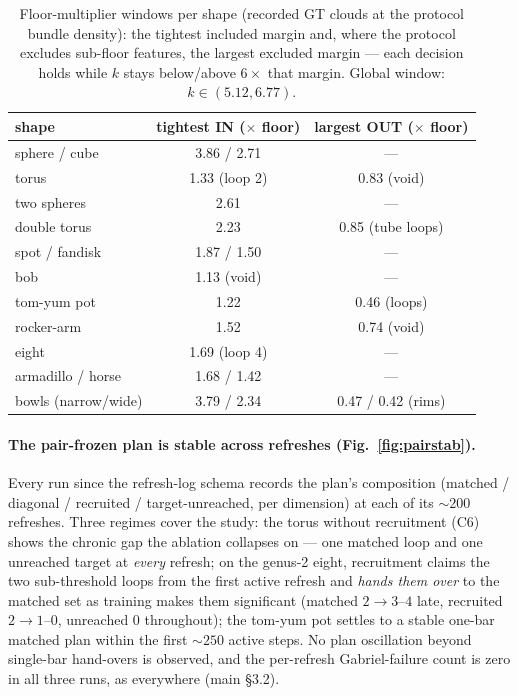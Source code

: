 \begin{table}[t]
\centering
\caption{Floor-multiplier windows per shape (recorded GT clouds at the
protocol bundle density): the tightest included margin and, where the
protocol excludes sub-floor features, the largest excluded margin ---
each decision holds while $k$ stays below/above $6\times$ that margin.
Global window: $k \in (5.12, 6.77)$.}
\label{tab:floorwin}
\scriptsize
\setlength{\tabcolsep}{3.5pt}
\begin{tabular}{lcc}
\toprule
shape & tightest IN ($\times$ floor) & largest OUT ($\times$ floor) \\
\midrule
sphere / cube    & 3.86 / 2.71 & --- \\
torus            & 1.33 (loop 2) & 0.83 (void) \\
two spheres      & 2.61 & --- \\
double torus     & 2.23 & 0.85 (tube loops) \\
spot / fandisk   & 1.87 / 1.50 & --- \\
bob              & 1.13 (void) & --- \\
tom-yum pot      & 1.22 & 0.46 (loops) \\
rocker-arm       & 1.52 & 0.74 (void) \\
eight            & 1.69 (loop 4) & --- \\
armadillo / horse & 1.68 / 1.42 & --- \\
bowls (narrow/wide) & 3.79 / 2.34 & 0.47 / 0.42 (rims) \\
\bottomrule
\end{tabular}
\end{table}

\paragraph{The pair-frozen plan is stable across refreshes
(Fig.~\ref{fig:pairstab}).}
Every run since the refresh-log schema records the plan's composition
(matched / diagonal / recruited / target-unreached, per dimension) at
each of its ${\sim}200$ refreshes. Three regimes cover the study:
the torus without recruitment (C6) shows the chronic gap the ablation
collapses on --- one matched loop and one unreached target at
\emph{every} refresh; on the genus-2 eight, recruitment claims the two
sub-threshold loops from the first active refresh and \emph{hands them
over} to the matched set as training makes them significant (matched
$2{\to}3$--$4$ late, recruited $2{\to}1$--$0$, unreached $0$
throughout); the tom-yum pot settles to a stable one-bar matched plan
within the first ${\sim}250$ active steps. No plan oscillation beyond
single-bar hand-overs is observed, and the per-refresh Gabriel-failure
count is zero in all three runs, as everywhere (main \S3.2).

